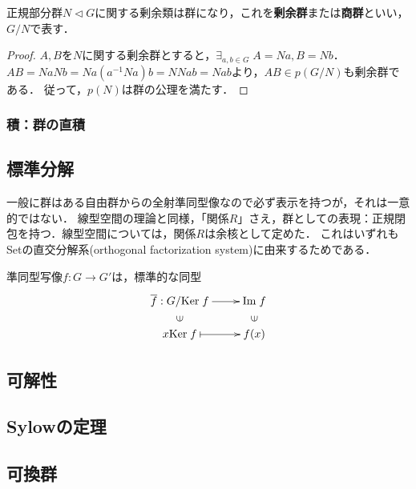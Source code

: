 \documentclass[uplatex,dvipdfmx]{jsreport}
\begin{document}
\begin{definition}
    正規部分群$N\triangleleft G$に関する剰余類は群になり，これを\textbf{剰余群}または\textbf{商群}といい，$G/N$で表す．
\end{definition}
\begin{proof}
    $A,B$を$N$に関する剰余群とすると，$\exists_{a,b\in G}\;A=Na,B=Nb$．
    $AB=NaNb=Na(a^{-1}Na)b=NNab=Nab$より，$AB\in p(G/N)$も剰余群である．
    従って，$p(N)$は群の公理を満たす．
\end{proof}

\subsubsection{積：群の直積}

\subsection{標準分解}

\begin{tcolorbox}[colframe=ForestGreen, colback=ForestGreen!10!white, breakable ,colbacktitle=ForestGreen!40!white, coltitle=black,fonttitle=\bfseries\sffamily,
    title=]
    一般に群はある自由群からの全射準同型像なので必ず表示を持つが，それは一意的ではない．
    線型空間の理論と同様，「関係$R$」さえ，群としての表現：正規閉包を持つ．線型空間については，関係$R$は余核として定めた．
    これはいずれもSetの直交分解系(orthogonal factorization system)に由来するためである．
\end{tcolorbox}

\begin{theorem}
    準同型写像$f:G\to G'$は，標準的な同型
    \[\xymatrix@R-2pc{
        \o{f}:G/\Ker f\ar[r]&\Im f\\
        \rotatebox[origin=c]{90}{$\in$}&\rotatebox[origin=c]{90}{$\in$}\\
        x\Ker f\ar@{|->}[r]&f(x)
    }\]
\end{theorem}

\subsection{可解性}

\subsection{Sylowの定理}

\subsection{可換群}
\end{document}
